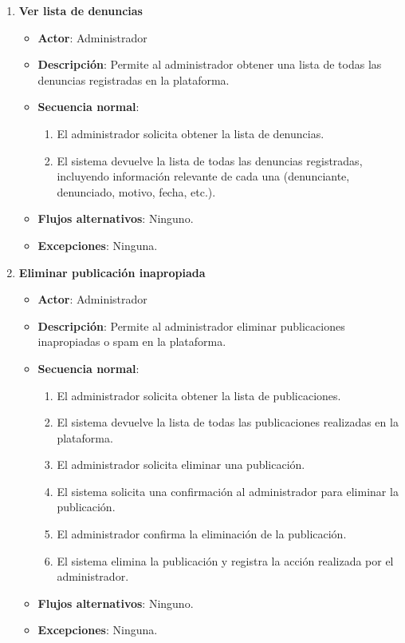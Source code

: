 \begin{enumerate}[label=UC-\protect\twodigits{\arabic*}:, align=left, leftmargin=*]
\item \textbf{Ver lista de denuncias}
\begin{itemize}
\item \textbf{Actor}: Administrador
\item \textbf{Descripción}: Permite al administrador obtener una lista de todas las denuncias registradas en la plataforma.
\item \textbf{Secuencia normal}:
\begin{enumerate}[label={\arabic*}:]
\item El administrador solicita obtener la lista de denuncias.
\item El sistema devuelve la lista de todas las denuncias registradas, incluyendo información relevante de cada una (denunciante, denunciado, motivo, fecha, etc.).
\end{enumerate}
\item \textbf{Flujos alternativos}: Ninguno.
\item \textbf{Excepciones}: Ninguna.
\end{itemize}

\item \textbf{Eliminar publicación inapropiada}
\begin{itemize}
\item \textbf{Actor}: Administrador
\item \textbf{Descripción}: Permite al administrador eliminar publicaciones inapropiadas o spam en la plataforma.
\item \textbf{Secuencia normal}:
\begin{enumerate}[label={\arabic*}:]
\item El administrador solicita obtener la lista de publicaciones.
\item El sistema devuelve la lista de todas las publicaciones realizadas en la plataforma.
\item El administrador solicita eliminar una publicación.
\item El sistema solicita una confirmación al administrador para eliminar la publicación.
\item El administrador confirma la eliminación de la publicación.
\item El sistema elimina la publicación y registra la acción realizada por el administrador.
\end{enumerate}
\item \textbf{Flujos alternativos}: Ninguno.
\item \textbf{Excepciones}: Ninguna.
\end{itemize}


\end{enumerate}
